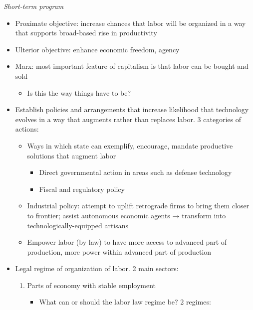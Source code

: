 \emph{Short-term program}

\begin{itemize}
\tightlist
\item
  Proximate objective: increase chances that labor will be organized in
  a way that supports broad-based rise in productivity
\item
  Ulterior objective: enhance economic freedom, agency
\item
  Marx: most important feature of capitalism is that labor can be bought
  and sold

  \begin{itemize}
  \tightlist
  \item
    Is this the way things have to be?
  \end{itemize}
\item
  Establish policies and arrangements that increase likelihood that
  technology evolves in a way that augments rather than replaces labor.
  3 categories of actions:

  \begin{itemize}
  \tightlist
  \item
    Ways in which state can exemplify, encourage, mandate productive
    solutions that augment labor

    \begin{itemize}
    \tightlist
    \item
      Direct governmental action in areas such as defense technology
    \item
      Fiscal and regulatory policy
    \end{itemize}
  \item
    Industrial policy: attempt to uplift retrograde firms to bring them
    closer to frontier; assist autonomous economic agents → transform
    into technologically-equipped artisans
  \item
    Empower labor (by law) to have more access to advanced part of
    production, more power within advanced part of production
  \end{itemize}
\item
  Legal regime of organization of labor. 2 main sectors:

  \begin{enumerate}
  \def\labelenumi{\arabic{enumi}.}
  \tightlist
  \item
    Parts of economy with stable employment

    \begin{itemize}
    \tightlist
    \item
      What can or should the labor law regime be? 2 regimes:


\end{itemize}
\end{enumerate}
\end{itemize}
